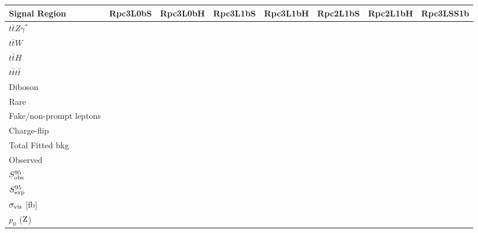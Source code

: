 \begin{table}
\begin{center}
\begin{tabular}{|l|r|r|r|r|r|r|r|}
\hline
Signal Region & {\bf Rpc3L0bS } & {\bf Rpc3L0bH } & {\bf Rpc3L1bS } & {\bf Rpc3L1bH } & {\bf Rpc2L1bS } & {\bf Rpc2L1bH } & {\bf Rpc3LSS1b }\\
\hline
\hline
$t\bar{t}Z\gamma^*$      &        &        &        &        &    &    &     \\
$t\bar{t}W$              &        &        &        &        &    &    &     \\
$t\bar{t}H$              &        &        &        &        &    &    &     \\
$t\bar{t}t\bar{t}$       &        &        &        &        &    &    &     \\
Diboson                  &        &        &        &        &    &    &     \\
Rare                     &        &        &        &        &    &    &     \\
Fake/non-prompt leptons  &        &        &        &        &   &     &     \\
Charge-flip              &        &        &        &        &   &     &     \\	
\hline
Total Fitted bkg         &        &        &        &        &   &      &    \\
\hline
Observed                 &        &        &        &        &   &      &    \\
\hline
$S_{\rm obs}^{95}$       &	  &	   &	    &	     &   &    &      \\
$S_{\rm exp}^{95}$       &	  &	   &	    &	     &   &    &      \\
$\sigma_{\rm{vis}}$ [fb] &        &        &        &        &   &    &      \\
$p_{0}$ ($\rm Z$)        &        &        &        &        &   &    &      \\
\hline 
\end{tabular}

\vspace*{1cm}


\end{center}
\end{table}
